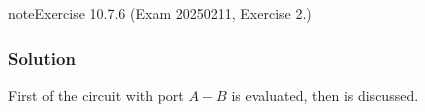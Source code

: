 \documentclass[letterpaper,10pt,italian]{jupyterBook}
\begin{document}
\begin{sphinxadmonition}{note}{Exercise 10.7.6 (Exam 2025\sphinxhyphen{}02\sphinxhyphen{}11, Exercise 2.)}



\begin{figure}[htbp]
\centering

\noindent{}
\end{figure}
\subsubsection*{Solution}

\sphinxAtStartPar
First {\hyperref[\detokenize{ch/electrical-engineering-networks:classical-electromagnetism-electrical-engineering-newtork-analysis-thevenin-1-port}]{}} of the circuit with port \(A-B\) is evaluated, then {\hyperref[\detokenize{ch/electrical-engineering-networks-harmonic:classical-electromagnetism-electrical-engineering-newtork-analysis-harmonic-power}]{}} is discussed.


\end{sphinxadmonition}
\end{document}
